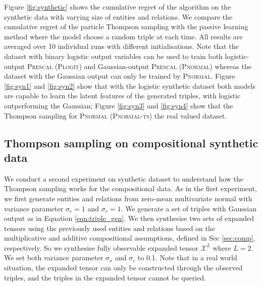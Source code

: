Figure \ref{fig:synthetic} shows the cumulative regret of the algorithm on the synthetic data with varying size of
entities and relations. We compare the cumulative regret of the particle Thompson sampling with the passive
learning method where the model choose a random triple at each time. All results are averaged over 10
individual runs with different initialisations.
Note that the dataset with binary logistic output variables can be used to train both logistic-output \textsc{Prescal} (\textsc{Plogit}) and Gaussian-output \textsc{Prescal} (\textsc{Pnormal}) whereas the dataset with the Gaussian output can only be trained by \textsc{Pnormal}.
Figure \ref{fig:syn1} and \ref{fig:syn2} show that with the logistic synthetic dataset both models are capable to learn the latent features of the generated triples, with logistic outperforming the Gaussian; Figure \ref{fig:syn3} and \ref{fig:syn4} show that the Thompson sampling for \textsc{Pnormal} (\textsc{Pnormal-ts})  the real valued dataset.

\subsection{Thompson sampling on compositional synthetic data}

We conduct a second experiment on synthetic dataset to understand how
the Thompson sampling works for the compositional data.
As in the first experiment, we first generate entities and relations from
zero-mean multivariate normal with variance parameter $\sigma_e = 1$ and
$\sigma_r=1$. We generate a set of triples with Gaussian output as in
Equation \ref{eqn:triple_gen}. We then synthesise two sets of expanded tensors
using the previously used entities and relations based on the multiplicative
and additive compositional assumptions, defined in Sec \ref{sec:comp},
respectively. So we synthesise fully observable expanded tensor $\mathcal{X}^L$
where $L=2$. We set both variance parameter $\sigma_x$ and $\sigma_c$ to 0.1.
Note that in a real world situation, the expanded tensor can only be constructed
through the observed triples, and the triples in the expanded tensor cannot be queried.

